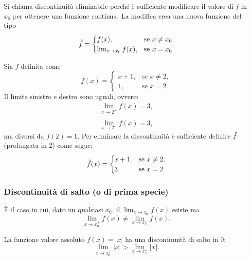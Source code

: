 Si chiama discontinuità eliminabile perché è sufficiente modificare il valore di $f$ in $x_0$ per ottenere una funzione continua. La modifica crea una nuova funzione del tipo
\begin{equation*}
    \Tilde{f}=
    \begin{cases}
        f(x), &\text{se } x\neq x_0\\
        \lim_{x\rightarrow x_0}f(x), &\text{se } x=x_0.
    \end{cases}
\end{equation*}

\begin{example}
    Sia $f$ definita come
    \begin{equation*}
        f(x)=
        \begin{cases}
            x+1, &\text{se } x\neq 2,\\
            1, &\text{se } x=2.
        \end{cases}
    \end{equation*}
    Il limite sinistro e destro sono uguali, ovvero:
    \begin{equation*}
        \begin{matrix}
            \lim_{x\rightarrow 2^+}f(x)=3,\\
            \\
            \lim_{x\rightarrow 2^-}f(x)=3,
        \end{matrix}
    \end{equation*}
    ma diversi da $f(2)=1$. Per eliminare la discontinuità è sufficiente definire $\Tilde{f}$ (prolungata in 2) come segue:
    \begin{equation*}
        \Tilde{f}(x)=
        \begin{cases}
            x+1, &\text{se } x\neq 2,\\
            3, &\text{se } x=2.
        \end{cases}
    \end{equation*}
\end{example}

\subsubsection{Discontinuità di salto (o di prima specie)}
\begin{definition}
    È il caso in cui, dato un qualsiasi $x_0$, il $\lim_{x\rightarrow x_0}f(x)$ esiste ma
    \begin{equation*}
        \lim_{x\rightarrow x_0^+}f(x)\neq\lim_{x\rightarrow x_0^-}f(x).
    \end{equation*}
\end{definition}
\begin{example}
    La funzione valore assoluto $f(x)=|x|$ ha una discontinuità di salto in 0:
    \begin{equation*}
        \lim_{x\rightarrow x_0^+}|x|>\lim_{x\rightarrow x_0^-}|x|.
    \end{equation*}
\end{example}

